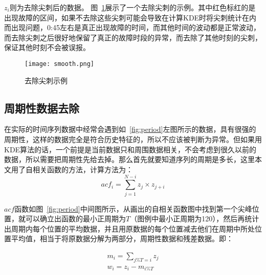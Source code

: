 $z_i$则为去除尖刺后的数据。
图~\ref{fig:smooth}展示了一个去除尖刺的示例。其中红色标红的是出现故障的区间，如果不去除这些尖刺可能会导致在计算KDE时将尖刺统计在内而出现问题，0:45左右是真正出现故障的时间，而其他时间的波动都是正常波动，而去除尖刺之后很好地保留了真正的故障时段的异常，而去除了其他时刻的尖刺，保证其他时刻不会被误报。

\begin{figure}[htbp]
  \centering
  \texttt{[image: smooth.png]}
  \caption{去除尖刺示例}
  \label{fig:smooth}
\end{figure}
\subsection{周期性数据去除}

在实际的时间序列数据中经常会遇到如~\ref{fig:period}左图所示的数据，具有很强的周期性，这样的数据完全是符合历史特征的，所以不应该被判断为异常。但如果用KDE算法的话，一个前提是当前数据只和周围数据相关，不会考虑到很久以前的数据，所以需要把周期性先给去掉。那么首先就要知道序列的周期是多长，这里本文用了自相关函数的方法，计算方法为：
\begin{equation*}
  acf_i = \sum_{j=1}^{N-i}z_j\times z_{j+i}
\end{equation*}

$acf$函数如图~\ref{fig:period}中间图所示，从画出的自相关函数图中找到第一个尖峰位置，就可以确立出函数的最小正周期为$T$（图例中最小正周期为120），然后再统计出周期内每个位置的平均数据，并且用原数据的每个位置减去他们在周期中所处位置平均值，相当于将原数据分解为两部分，周期性数据和残差数据。即：

\begin{equation*}
  \begin{aligned}
  m_i = \sum_{j\%T = i}z_j\\
  w_i = z_i - m_{i\%T}
  \end{aligned}
\end{equation*}

